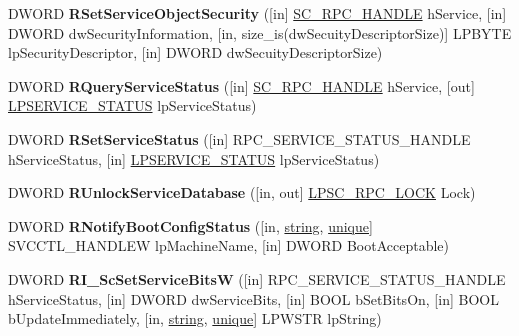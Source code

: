 \begin{DoxyCompactItemize}
\item 
\mbox{\label{interfacesvcctl_a151bdc12e648b0e1427ed4cd54c0d390}} 
D\+W\+O\+RD {\bfseries R\+Set\+Service\+Object\+Security} (\mbox{[}in\mbox{]} \hyperlink{interfacevoid}{S\+C\+\_\+\+R\+P\+C\+\_\+\+H\+A\+N\+D\+LE} h\+Service, \mbox{[}in\mbox{]} D\+W\+O\+RD dw\+Security\+Information, \mbox{[}in, size\+\_\+is(dw\+Secuity\+Descriptor\+Size)\mbox{]} L\+P\+B\+Y\+TE lp\+Security\+Descriptor, \mbox{[}in\mbox{]} D\+W\+O\+RD dw\+Secuity\+Descriptor\+Size)
\item 
\mbox{\label{interfacesvcctl_a45be2c0ed2b8fdaeb2989c95d606c069}} 
D\+W\+O\+RD {\bfseries R\+Query\+Service\+Status} (\mbox{[}in\mbox{]} \hyperlink{interfacevoid}{S\+C\+\_\+\+R\+P\+C\+\_\+\+H\+A\+N\+D\+LE} h\+Service, \mbox{[}out\mbox{]} \hyperlink{struct___s_e_r_v_i_c_e___s_t_a_t_u_s}{L\+P\+S\+E\+R\+V\+I\+C\+E\+\_\+\+S\+T\+A\+T\+US} lp\+Service\+Status)
\item 
\mbox{\label{interfacesvcctl_ab8c4fc9164b9bcadfbd2b507ff16fd97}} 
D\+W\+O\+RD {\bfseries R\+Set\+Service\+Status} (\mbox{[}in\mbox{]} R\+P\+C\+\_\+\+S\+E\+R\+V\+I\+C\+E\+\_\+\+S\+T\+A\+T\+U\+S\+\_\+\+H\+A\+N\+D\+LE h\+Service\+Status, \mbox{[}in\mbox{]} \hyperlink{struct___s_e_r_v_i_c_e___s_t_a_t_u_s}{L\+P\+S\+E\+R\+V\+I\+C\+E\+\_\+\+S\+T\+A\+T\+US} lp\+Service\+Status)
\item 
\mbox{\label{interfacesvcctl_aabf5baa3de70ccc62dfb411993ce1b0f}} 
D\+W\+O\+RD {\bfseries R\+Unlock\+Service\+Database} (\mbox{[}in, out\mbox{]} \hyperlink{interfacevoid}{L\+P\+S\+C\+\_\+\+R\+P\+C\+\_\+\+L\+O\+CK} Lock)
\item 
\mbox{\label{interfacesvcctl_a122fdaa6225e14b0742816d04f439c4c}} 
D\+W\+O\+RD {\bfseries R\+Notify\+Boot\+Config\+Status} (\mbox{[}in, \hyperlink{structstring}{string}, \hyperlink{interfaceunique}{unique}\mbox{]} S\+V\+C\+C\+T\+L\+\_\+\+H\+A\+N\+D\+L\+EW lp\+Machine\+Name, \mbox{[}in\mbox{]} D\+W\+O\+RD Boot\+Acceptable)
\item 
\mbox{\label{interfacesvcctl_a1e00803baeb34ac58c1bc322f083e3de}} 
D\+W\+O\+RD {\bfseries R\+I\+\_\+\+Sc\+Set\+Service\+BitsW} (\mbox{[}in\mbox{]} R\+P\+C\+\_\+\+S\+E\+R\+V\+I\+C\+E\+\_\+\+S\+T\+A\+T\+U\+S\+\_\+\+H\+A\+N\+D\+LE h\+Service\+Status, \mbox{[}in\mbox{]} D\+W\+O\+RD dw\+Service\+Bits, \mbox{[}in\mbox{]} B\+O\+OL b\+Set\+Bits\+On, \mbox{[}in\mbox{]} B\+O\+OL b\+Update\+Immediately, \mbox{[}in, \hyperlink{structstring}{string}, \hyperlink{interfaceunique}{unique}\mbox{]} L\+P\+W\+S\+TR lp\+String)

\end{DoxyCompactItemize}
